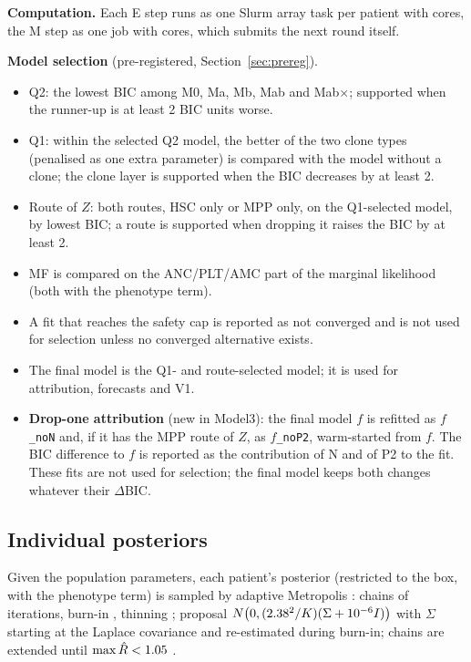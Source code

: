 \documentclass[11pt]{article}
\begin{document}
\textbf{Computation.} Each E step runs as one Slurm array task per patient with \valEcores{} cores, the M step as one job with \valMcores{} cores, which submits the next round itself.



\textbf{Model selection} (pre-registered, Section~\ref{sec:prereg}).
\begin{itemize}
\item Q2: the lowest BIC among M0, Ma, Mb, Mab and Mab$\times$; supported when the runner-up is at least 2 BIC units worse.
\item Q1: within the selected Q2 model, the better of the two clone types (penalised as one extra parameter) is compared with the model without a clone; the clone layer is supported when the BIC decreases by at least 2.
\item Route of $Z$: both routes, HSC only or MPP only, on the Q1-selected model, by lowest BIC; a route is supported when dropping it raises the BIC by at least 2.
\item MF is compared on the ANC/PLT/AMC part of the marginal likelihood (both with the phenotype term).
\item A fit that reaches the safety cap is reported as not converged and is not used for selection unless no converged alternative exists.
\item The final model is the Q1- and route-selected model; it is used for attribution, forecasts and V1.
\item \textbf{Drop-one attribution} (new in Model3): the final model $f$ is refitted as $f$\texttt{\_noN} and, if it has the MPP route of $Z$, as $f$\texttt{\_noP2}, warm-started from $f$. The BIC difference to $f$ is reported as the contribution of N and of P2 to the fit. These fits are not used for selection; the final model keeps both changes whatever their $\Delta$BIC.
\end{itemize}

\subsection{Individual posteriors}
Given the population parameters, each patient's posterior (restricted to the box, with the phenotype term) is sampled by adaptive Metropolis \citep{haario2001}: \valChains{} chains of \valIter{} iterations, burn-in \valBurn, thinning \valThin; proposal $N\bigl(0,(2.38^2/K)(\Sigma+10^{-6}I)\bigr)$ with $\Sigma$ starting at the Laplace covariance and re-estimated during burn-in; chains are extended until $\max\hat R<1.05$ \citep{gelman1992}.
\end{document}
